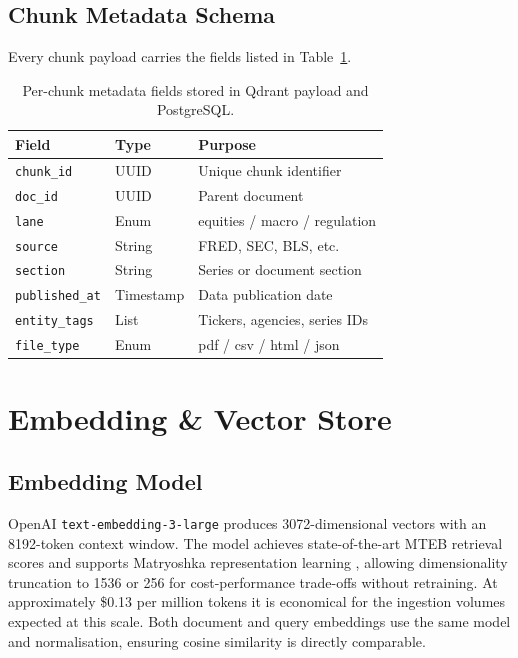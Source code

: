 \documentclass[10pt,a4paper,twocolumn]{article}
\begin{document}
\subsection{Chunk Metadata Schema}

Every chunk payload carries the fields listed in Table~\ref{tab:metadata}.

\begin{table}[H]
\centering
\caption{Per-chunk metadata fields stored in Qdrant payload and PostgreSQL.}
\label{tab:metadata}
\scriptsize
\begin{tabular}{lll}
\toprule
\textbf{Field} & \textbf{Type} & \textbf{Purpose} \\
\midrule
\texttt{chunk\_id}     & UUID      & Unique chunk identifier \\
\texttt{doc\_id}       & UUID      & Parent document \\
\texttt{lane}          & Enum      & equities / macro / regulation \\
\texttt{source}        & String    & FRED, SEC, BLS, etc. \\
\texttt{section}       & String    & Series or document section \\
\texttt{published\_at} & Timestamp & Data publication date \\
\texttt{entity\_tags}  & List      & Tickers, agencies, series IDs \\
\texttt{file\_type}    & Enum      & pdf / csv / html / json \\
\bottomrule
\end{tabular}
\end{table}

\section{Embedding \& Vector Store}

\subsection{Embedding Model}

OpenAI \texttt{text-embedding-3-large} produces 3072-dimensional vectors with an 8192-token
context window. The model achieves state-of-the-art MTEB retrieval scores and supports
Matryoshka representation learning \cite{kusupati2022matryoshka}, allowing dimensionality
truncation to 1536 or 256 for cost-performance trade-offs without retraining. At approximately
\$0.13 per million tokens it is economical for the ingestion volumes expected at this scale.
Both document and query embeddings use the same model and normalisation, ensuring cosine
similarity is directly comparable.
\end{document}
